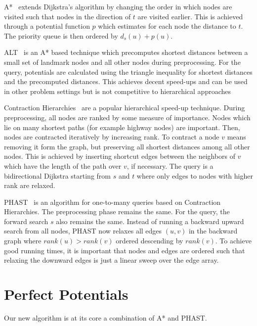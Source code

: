 \documentclass[a4paper,UKenglish,cleveref, autoref]{lipics-v2019}
\begin{document}
A*~\cite{?} extends Dijkstra's algorithm by changing the order in which nodes are visited such that nodes in the direction of $t$ are visited earlier.
This is achieved through a potential function $p$ which estimates for each node the distance to $t$.
The priority queue is then ordered by $d_s(u) + p(u)$.

ALT~\cite{ALT} is an A* based technique which precomputes shortest distances between a small set of landmark nodes and all other nodes during preprocessing.
For the query, potentials are calculated using the triangle inequality for shortest distances and the precomputed distances.
This achieves decent speed-ups and can be used in other problem settings but is not competitive to hierarchical approaches

Contraction Hierarchies~\cite{CH} are a popular hierarchical speed-up technique.
During preprocessing, all nodes are ranked by some measure of importance.
Nodes which lie on many shortest paths (for example highway nodes) are important.
Then, nodes are contracted iteratively by increasing rank.
To contract a node $v$ means removing it form the graph, but preserving all shortest distances among all other nodes.
This is achieved by inserting shortcut edges between the neighbors of $v$ which have the length of the path over $v$, if necessary.
The query is a bidirectional Dijkstra starting from $s$ and $t$ where only edges to nodes with higher rank are relaxed.

PHAST~\cite{?} is an algorithm for one-to-many queries based on Contraction Hierarchies.
The preprocessing phase remains the same.
For the query, the forward search $s$ also remains the same.
Instead of running a backward upward search from all nodes, PHAST now relaxes all edges $(u,v)$ in the backward graph where $rank(u) > rank(v)$ ordered descending by $rank(v)$.
To achieve good running times, it is important that nodes and edges are ordered such that relaxing the downward edges is just a linear sweep over the edge array.


\section{Perfect Potentials}
\label{sec:algo}

Our new algorithm is at its core a combination of A* and PHAST.
\end{document}

